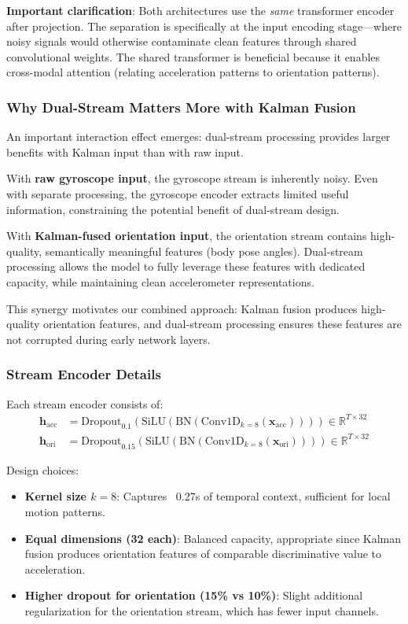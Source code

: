 \textbf{Important clarification}: Both architectures use the \textit{same} transformer encoder after projection. The separation is specifically at the input encoding stage---where noisy signals would otherwise contaminate clean features through shared convolutional weights. The shared transformer is beneficial because it enables cross-modal attention (relating acceleration patterns to orientation patterns).

\subsubsection{Why Dual-Stream Matters More with Kalman Fusion}

An important interaction effect emerges: dual-stream processing provides larger benefits with Kalman input than with raw input.

With \textbf{raw gyroscope input}, the gyroscope stream is inherently noisy. Even with separate processing, the gyroscope encoder extracts limited useful information, constraining the potential benefit of dual-stream design.

With \textbf{Kalman-fused orientation input}, the orientation stream contains high-quality, semantically meaningful features (body pose angles). Dual-stream processing allows the model to fully leverage these features with dedicated capacity, while maintaining clean accelerometer representations.

This synergy motivates our combined approach: Kalman fusion produces high-quality orientation features, and dual-stream processing ensures these features are not corrupted during early network layers.

\subsubsection{Stream Encoder Details}

Each stream encoder consists of:
\begin{align}
\mathbf{h}_\text{acc} &= \text{Dropout}_{0.1}(\text{SiLU}(\text{BN}(\text{Conv1D}_{k=8}(\mathbf{x}_\text{acc})))) \in \mathbb{R}^{T \times 32} \\
\mathbf{h}_\text{ori} &= \text{Dropout}_{0.15}(\text{SiLU}(\text{BN}(\text{Conv1D}_{k=8}(\mathbf{x}_\text{ori})))) \in \mathbb{R}^{T \times 32}
\end{align}

Design choices:
\begin{itemize}
    \item \textbf{Kernel size $k=8$}: Captures ~0.27s of temporal context, sufficient for local motion patterns.
    \item \textbf{Equal dimensions (32 each)}: Balanced capacity, appropriate since Kalman fusion produces orientation features of comparable discriminative value to acceleration.
    \item \textbf{Higher dropout for orientation (15\% vs 10\%)}: Slight additional regularization for the orientation stream, which has fewer input channels.
\end{itemize}

